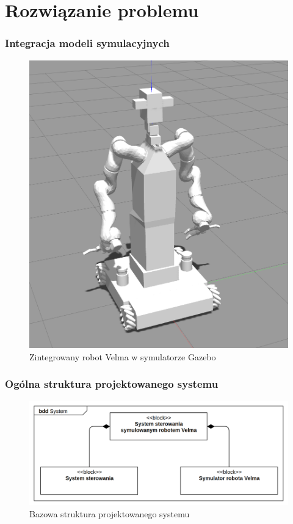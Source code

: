 \section{Rozwiązanie problemu} 

\begin{frame}
    \frametitle{Integracja modeli symulacyjnych}
    \begin{figure}
        \includegraphics[scale=0.20]{./images/omnivelmobil-final-cropped.png}
        \caption{Zintegrowany robot Velma w symulatorze Gazebo}
    \end{figure}
\end{frame}

\begin{frame}
    \frametitle{Ogólna struktura projektowanego systemu} 
    \begin{figure}[b]
        \label{system_overview}
        \centering
        \def\svgwidth{\columnwidth}
        \vspace{0.1cm}
        \includegraphics[scale=0.25]{images/basic_system.png}
        \vspace{0.1cm}
        \caption{Bazowa struktura projektowanego systemu}
    \end{figure}
\end{frame}

